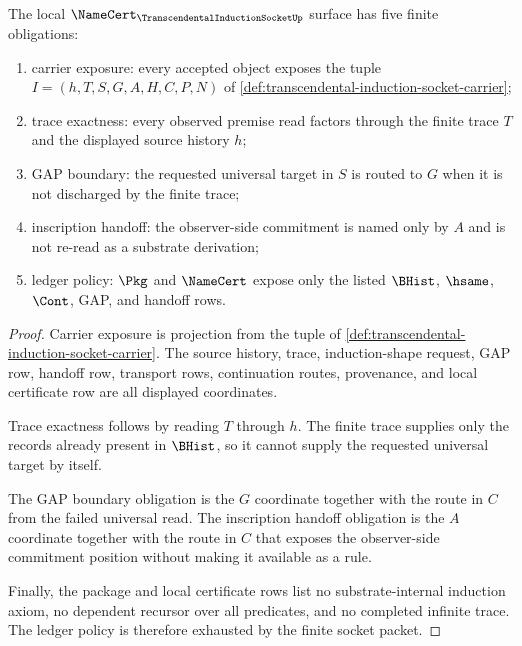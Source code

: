 \begin{theorem}
\label{thm:transcendental-induction-socket-namecert-obligations}
The local $\NameCert_{\TranscendentalInductionSocketUp}$ surface has five finite obligations:
\begin{enumerate}
\item carrier exposure: every accepted object exposes the tuple $I=(h,T,S,G,A,H,C,P,N)$ of \autoref{def:transcendental-induction-socket-carrier};
\item trace exactness: every observed premise read factors through the finite trace $T$ and the displayed source history $h$;
\item GAP boundary: the requested universal target in $S$ is routed to $G$ when it is not discharged by the finite trace;
\item inscription handoff: the observer-side commitment is named only by $A$ and is not re-read as a substrate derivation;
\item ledger policy: $\Pkg$ and $\NameCert$ expose only the listed $\BHist$, $\hsame$, $\Cont$, GAP, and handoff rows.
\end{enumerate}
\end{theorem}
\begin{proof}
Carrier exposure is projection from the tuple of \autoref{def:transcendental-induction-socket-carrier}. The source history, trace, induction-shape request, GAP row, handoff row, transport rows, continuation routes, provenance, and local certificate row are all displayed coordinates.

Trace exactness follows by reading $T$ through $h$. The finite trace supplies only the records already present in $\BHist$, so it cannot supply the requested universal target by itself.

The GAP boundary obligation is the $G$ coordinate together with the route in $C$ from the failed universal read. The inscription handoff obligation is the $A$ coordinate together with the route in $C$ that exposes the observer-side commitment position without making it available as a rule.

Finally, the package and local certificate rows list no substrate-internal induction axiom, no dependent recursor over all predicates, and no completed infinite trace. The ledger policy is therefore exhausted by the finite socket packet.
\end{proof}

